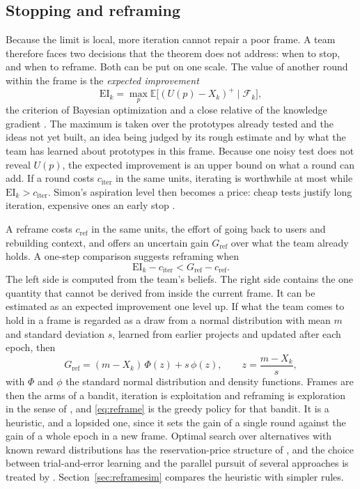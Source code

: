 \documentclass[10pt,twocolumn]{article}
\newcommand{\E}{\mathbb{E}}
\newcommand{\filt}{\mathcal{F}}
\theoremstyle{definition}
\begin{document}
\subsection{Stopping and reframing}
\label{sec:reframe}

Because the limit is local, more iteration cannot repair a poor frame. A team therefore faces two decisions that the theorem does not address: when to stop, and when to reframe. Both can be put on one scale. The value of another round within the frame is the \emph{expected improvement}
\begin{equation}
\label{eq:ei}
\mathrm{EI}_k=\max_p\E\big[(U(p)-X_k)^+\mid\filt_k\big],
\end{equation}
the criterion of Bayesian optimization \citep{jones1998} and a close relative of the knowledge gradient \citep{frazier2008}. The maximum is taken over the prototypes already tested and the ideas not yet built, an idea being judged by its rough estimate and by what the team has learned about prototypes in this frame. Because one noisy test does not reveal $U(p)$, the expected improvement is an upper bound on what a round can add. If a round costs $c_{\mathrm{iter}}$ in the same units, iterating is worthwhile at most while $\mathrm{EI}_k>c_{\mathrm{iter}}$. Simon's aspiration level then becomes a price: cheap tests justify long iteration, expensive ones an early stop \citep{simon1956}.

A reframe costs $c_{\mathrm{ref}}$ in the same units, the effort of going back to users and rebuilding context, and offers an uncertain gain $G_{\mathrm{ref}}$ over what the team already holds. A one-step comparison suggests reframing when
\begin{equation}
\label{eq:reframe}
\mathrm{EI}_k-c_{\mathrm{iter}}<G_{\mathrm{ref}}-c_{\mathrm{ref}} .
\end{equation}
The left side is computed from the team's beliefs. The right side contains the one quantity that cannot be derived from inside the current frame. It can be estimated as an expected improvement one level up. If what the team comes to hold in a frame is regarded as a draw from a normal distribution with mean $m$ and standard deviation $s$, learned from earlier projects and updated after each epoch, then
\begin{equation}
\label{eq:gref}
G_{\mathrm{ref}}=(m-X_k)\,\Phi(z)+s\,\phi(z),\qquad z=\frac{m-X_k}{s},
\end{equation}
with $\Phi$ and $\phi$ the standard normal distribution and density functions. Frames are then the arms of a bandit, iteration is exploitation and reframing is exploration in the sense of \citet{march1991}, and \eqref{eq:reframe} is the greedy policy for that bandit. It is a heuristic, and a lopsided one, since it sets the gain of a single round against the gain of a whole epoch in a new frame. Optimal search over alternatives with known reward distributions has the reservation-price structure of \citet{weitzman1979}, and the choice between trial-and-error learning and the parallel pursuit of several approaches is treated by \citet{sommerloch2004}. Section~\ref{sec:reframesim} compares the heuristic with simpler rules.
\end{document}

